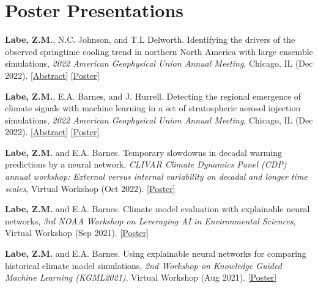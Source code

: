 \documentclass[margin,line,palatino,courier,10pt]{res}
\begin{document}
\begin{resume}
\begin{etaremune}[leftmargin=0in,topsep=0in,parsep=0in]
\end{etaremune}

\section{\sc \textcolor{Cerulean}{\large{\textbf{Poster Presentations}}}}
\begin{etaremune}[leftmargin=0in,topsep=0in,parsep=0in]
\item \textbf{Labe, Z.M.}, N.C. Johnson, and T.L Delworth. Identifying the drivers of the observed springtime cooling trend in northern North America with large ensemble simulations, \textit{2022 American Geophysical Union Annual Meeting}, Chicago, IL (Dec 2022). \href{https://agu.confex.com/agu/fm22/meetingapp.cgi/Paper/1111909}{[Abstract]} \href{https://zacklabe.files.wordpress.com/2022/12/labejohnsondelworth_agu_largeensembles2022_poster.pdf}{[Poster]}
\item \textbf{Labe, Z.M.}, E.A. Barnes, and J. Hurrell. Detecting the regional emergence of climate signals with machine learning in a set of stratospheric aerosol injection simulations, \textit{2022 American Geophysical Union Annual Meeting}, Chicago, IL (Dec 2022). \href{https://agu.confex.com/agu/fm22/meetingapp.cgi/Paper/1110391}{[Abstract]} \href{https://zacklabe.files.wordpress.com/2022/12/labebarneshurrell_agu_sai2022_poster.pdf}{[Poster]}
\item \textbf{Labe, Z.M.} and E.A. Barnes. Temporary slowdowns in decadal warming predictions by a neural network, \textit{CLIVAR Climate Dynamics Panel (CDP) annual workshop: External versus internal variability on decadal and longer time scales}, Virtual Workshop (Oct 2022). \href{https://zacklabe.files.wordpress.com/2022/09/labebarnes_poster_10-2022.pdf}{[Poster]}
\item \textbf{Labe, Z.M.} and E.A. Barnes. Climate model evaluation with explainable neural networks, \textit{3rd NOAA Workshop on Leveraging AI in Environmental Sciences}, Virtual Workshop (Sep 2021). \href{https://zacklabe.files.wordpress.com/2022/08/b875c-labebarnes_noaa-aies_2021_poster.pdf}{[Poster]}
\item \textbf{Labe, Z.M.} and E.A. Barnes. Using explainable neural networks for comparing historical climate model simulations, \textit{2nd Workshop on Knowledge Guided Machine Learning (KGML2021)}, Virtual Workshop (Aug 2021). \href{https://zacklabe.files.wordpress.com/2022/08/aa648-labebarnes_kgml2021_poster_v2_final.pdf}{[Poster]}

\end{etaremune}
\end{resume}
\end{document}
